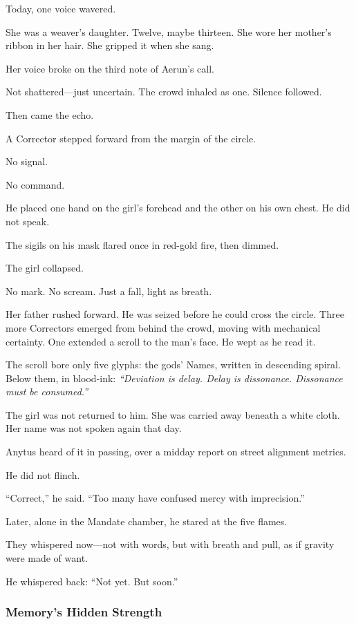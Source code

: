 \documentclass[12pt]{article}
\begin{document}
Today, one voice wavered.

She was a weaver’s daughter. Twelve, maybe thirteen. She wore her mother’s ribbon in her hair. She gripped it when she sang.

Her voice broke on the third note of Aerun’s call. 

Not shattered—just uncertain. The crowd inhaled as one. Silence followed.

Then came the echo.

A Corrector stepped forward from the margin of the circle. 

No signal. 

No command. 

He placed one hand on the girl’s forehead and the other on his own chest. He did not speak. 

The sigils on his mask flared once in red-gold fire, then dimmed.

The girl collapsed.

No mark. No scream. Just a fall, light as breath.

Her father rushed forward. He was seized before he could cross the circle. Three more Correctors emerged from behind the crowd, moving with mechanical certainty. One extended a scroll to the man’s face. He wept as he read it.

The scroll bore only five glyphs: the gods’ Names, written in descending spiral. Below them, in blood-ink: \textit{“Deviation is delay. Delay is dissonance. Dissonance must be consumed.”}

The girl was not returned to him. She was carried away beneath a white cloth. Her name was not spoken again that day.

Anytus heard of it in passing, over a midday report on street alignment metrics. 

He did not flinch. 

“Correct,” he said. “Too many have confused mercy with imprecision.”

Later, alone in the Mandate chamber, he stared at the five flames.

They whispered now—not with words, but with breath and pull, as if gravity were made of want.

He whispered back: “Not yet. But soon.”

\dotfill

\subsubsection{Memory's Hidden Strength}
\end{document}
